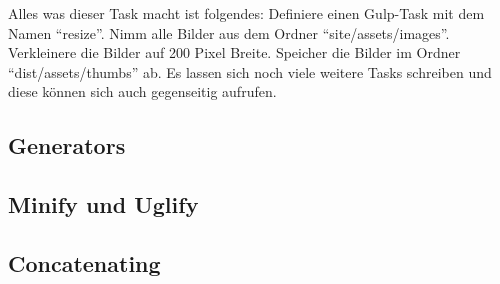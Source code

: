 		Alles was dieser Task macht ist folgendes: Definiere einen Gulp-Task mit dem Namen "`resize"'. Nimm alle Bilder aus dem Ordner "`site/assets/images"'. Verkleinere die Bilder auf 200 Pixel Breite. Speicher die Bilder im Ordner "`dist/assets/thumbs"' ab. Es lassen sich noch viele weitere Tasks schreiben und diese können sich auch gegenseitig aufrufen. 
		


	\subsection{Generators}
	\label{sub:generators}
	

	\subsection{Minify und Uglify}
	\label{sub:minify_und_uglify}
	

	\subsection{Concatenating}
	\label{sub:concatenating}
	

	

\pagebreak